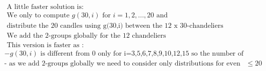 \documentclass[10pt,a4paper]{letter}
\begin{document}
\begin{align*}
&\text{ A little faster solution is:  }\\
&\text{ We only to compute }g(30,i)\text{ for }i=1,2,...,20\text{ and}\\
&\text{ distribute the 20 candles using g(30,i) between the 12 x 30-chandeliers } \\
&\text{ We add the 2-groups globally for the 12 chandeliers}\\
&\text{ This version is faster as : }\\
&- g(30,i)\text{ is different from 0 only for i=3,5,6,7,8,9,10,12,15 so the number of distribution is reduced}\\
&\text{- as we add 2-groups globally we need to consider only distributions for even sums }\leq 20\\
\end{align*}
\end{document}
